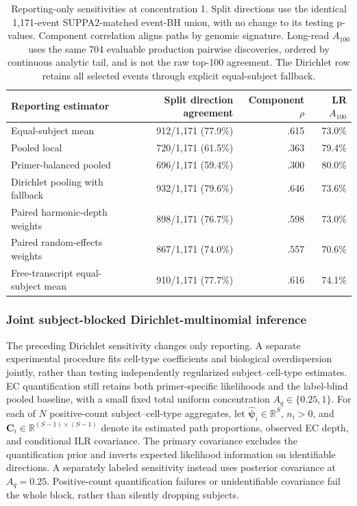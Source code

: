 \documentclass[11pt]{article}
\begin{document}
\begin{table}[H]
\centering
\caption{Reporting-only sensitivities at concentration 1. Split directions use the identical 1,171-event SUPPA2-matched event-BH union, with no change to its testing p-values. Component correlation aligns paths by genomic signature. Long-read \(A_{100}\) uses the same 704 evaluable production pairwise discoveries, ordered by continuous analytic tail, and is not the raw top-100 agreement. The Dirichlet row retains all selected events through explicit equal-subject fallback.}
\label{tab:reporting-split-sensitivity}
\begin{tabular}{lrrr}
\toprule
Reporting estimator & Split direction agreement & Component \(\rho\) & LR \(A_{100}\)\\
\midrule
Equal-subject mean & 912/1,171 (77.9\%) & .615 & 73.0\%\\
Pooled local & 720/1,171 (61.5\%) & .363 & 79.4\%\\
Primer-balanced pooled & 696/1,171 (59.4\%) & .300 & 80.0\%\\
Dirichlet pooling with fallback & 932/1,171 (79.6\%) & .646 & 73.6\%\\
Paired harmonic-depth weights & 898/1,171 (76.7\%) & .598 & 73.0\%\\
Paired random-effects weights & 867/1,171 (74.0\%) & .557 & 70.6\%\\
Free-transcript equal-subject mean & 910/1,171 (77.7\%) & .616 & 74.1\%\\
\bottomrule
\end{tabular}
\end{table}

\subsubsection*{Joint subject-blocked Dirichlet-multinomial inference}

The preceding Dirichlet sensitivity changes only reporting. A separate experimental procedure fits cell-type coefficients and biological overdispersion jointly, rather than testing independently regularized subject--cell-type estimates. EC quantification still retains both primer-specific likelihoods and the label-blind pooled baseline, with a small fixed total uniform concentration \(A_q\in\{0.25,1\}\). For each of \(N\) positive-count subject--cell-type aggregates, let \(\widehat{\boldsymbol\psi}_i\in\mathbb R^S\), \(n_i>0\), and \(\mathbf C_i\in\mathbb R^{(S-1)\times(S-1)}\) denote its estimated path proportions, observed EC depth, and conditional ILR covariance. The primary covariance excludes the quantification prior and inverts expected likelihood information on identifiable directions. A separately labeled sensitivity instead uses posterior covariance at \(A_q=0.25\). Positive-count quantification failures or unidentifiable covariance fail the whole block, rather than silently dropping subjects.
\end{document}
